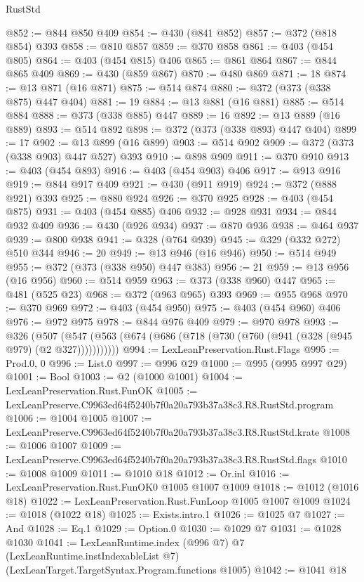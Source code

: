\begin{lexlean}{RustStd}
\begin{coremodule}
@852 := @844 @850 @409
@854 := @430 (@841 @852)
@857 := @372 (@818 @854) @393
@858 := @810 @857
@859 := @370 @858
@861 := @403 (@454 @805)
@864 := @403 (@454 @815) @406
@865 := @861 @864
@867 := @844 @865 @409
@869 := @430 (@859 @867)
@870 := @480 @869
@871 := 18
@874 := @13 @871 (@16 @871)
@875 := @514 @874
@880 := @372 (@373 (@338 @875) @447 @404)
@881 := 19
@884 := @13 @881 (@16 @881)
@885 := @514 @884
@888 := @373 (@338 @885) @447
@889 := 16
@892 := @13 @889 (@16 @889)
@893 := @514 @892
@898 := @372 (@373 (@338 @893) @447 @404)
@899 := 17
@902 := @13 @899 (@16 @899)
@903 := @514 @902
@909 := @372 (@373 (@338 @903) @447 @527) @393
@910 := @898 @909
@911 := @370 @910
@913 := @403 (@454 @893)
@916 := @403 (@454 @903) @406
@917 := @913 @916
@919 := @844 @917 @409
@921 := @430 (@911 @919)
@924 := @372 (@888 @921) @393
@925 := @880 @924
@926 := @370 @925
@928 := @403 (@454 @875)
@931 := @403 (@454 @885) @406
@932 := @928 @931
@934 := @844 @932 @409
@936 := @430 (@926 @934)
@937 := @870 @936
@938 := @464 @937
@939 := @800 @938
@941 := @328 (@764 @939)
@945 := @329 (@332 @272) @510 @344
@946 := 20
@949 := @13 @946 (@16 @946)
@950 := @514 @949
@955 := @372 (@373 (@338 @950) @447 @383)
@956 := 21
@959 := @13 @956 (@16 @956)
@960 := @514 @959
@963 := @373 (@338 @960) @447
@965 := @481 (@525 @23)
@968 := @372 (@963 @965) @393
@969 := @955 @968
@970 := @370 @969
@972 := @403 (@454 @950)
@975 := @403 (@454 @960) @406
@976 := @972 @975
@978 := @844 @976 @409
@979 := @970 @978
@993 := @326
    (@507 (@547 (@563 (@674 (@686 (@718 (@730 (@760 (@941 (@328 (@945 @979) (@2 @327)))))))))))
@994 := LexLeanPreservation.Rust.Flags
@995 := Prod.{0, 0}
@996 := List.{0}
@997 := @996 @29
@1000 := @995 (@995 @997 @29)
@1001 := Bool
@1003 := @2 (@1000 @1001)
@1004 := LexLeanPreservation.Rust.FunOK
@1005 := LexLeanPreserve.C9963ed64f5240b7f0a20a793b37a38c3.R8.RustStd.program
@1006 := @1004 @1005
@1007 := LexLeanPreserve.C9963ed64f5240b7f0a20a793b37a38c3.R8.RustStd.krate
@1008 := @1006 @1007
@1009 := LexLeanPreserve.C9963ed64f5240b7f0a20a793b37a38c3.R8.RustStd.flags
@1010 := @1008 @1009
@1011 := @1010 @18
@1012 := Or.inl
@1016 := LexLeanPreservation.Rust.FunOK0 @1005 @1007 @1009
@1018 := @1012 (@1016 @18)
@1022 := LexLeanPreservation.Rust.FunLoop @1005 @1007 @1009
@1024 := @1018 (@1022 @18)
@1025 := Exists.intro.{1}
@1026 := @1025 @7
@1027 := And
@1028 := Eq.{1}
@1029 := Option.{0}
@1030 := @1029 @7
@1031 := @1028 @1030
@1041 := LexLeanRuntime.index
    (@996 @7)
    @7
    (LexLeanRuntime.instIndexableList @7)
    (LexLeanTarget.TargetSyntax.Program.functions @1005)
@1042 := @1041 @18

\end{coremodule}
\end{lexlean}
